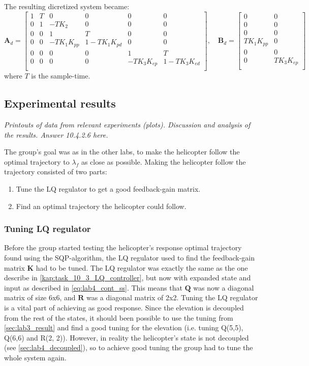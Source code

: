 \documentclass[../main.tex]{subfiles}
\begin{document}
The resulting dicretized system became: 
\begin{equation}\label{eq:lab4_disc_ss}
	\bm A_d = \begin{bmatrix}
		1 & T & 0 & 0 & 0 & 0\\
		0 & 1 & -TK_2 & 0 & 0 & 0\\
		0 & 0 & 1 & T & 0 & 0\\
		0 & 0 & -T K_1 K_{pp} &  1 - T K_1 K_{pd} & 0 & 0\\
		0 & 0 & 0 & 0 & 1 & T \\
		0 & 0 & 0 & 0 & -T K_3 K_{ep} & 1 - TK_3K_{ed} \\
	\end{bmatrix}, \quad
	\bm B_d = \begin{bmatrix}
		0 & 0 \\
		0 & 0\\
		0 & 0\\
		T K_1 K_{pp} & 0\\
		0 & 0 \\
		0 & T K_3K_{ep} \\
	\end{bmatrix}
\end{equation}
where $ T $ is the sample-time.

\subsection{Experimental results}
\textit{Printouts of data from relevant experiments (plots).
Discussion and analysis of the results.
Answer 10.4.2.6 here.}

The group's goal was as in the other labs, to make the helicopter follow the optimal trajectory to $ \lambda_f $ as close as possible. Making the helicopter follow the trajectory consisted of two parts: 
\begin{enumerate}
	\item Tune the LQ regulator to get a good feedback-gain matrix.
	\item Find an optimal trajectory the helicopter could follow.
\end{enumerate}

\subsubsection{Tuning LQ regulator}
Before the group started testing the helicopter's response optimal trajectory found using the SQP-algorithm, the LQ regulator used to find the feedback-gain matrix $\bm K$ had to be tuned. The LQ regulator was exactly the same as the one describe in \cref{kap:task_10_3_LQ_controller}, but now with expanded state and input as described in \cref{eq:lab4_cont_ss}. This means that $ \bm Q $ was now a diagonal matrix of size 6x6, and $ \bm R $ was a diagonal matrix of 2x2. Tuning the LQ regulator is a vital part of achieving as good response. Since the elevation is decoupled from the rest of the states, it should been possible to use the tuning from \cref{sec:lab3_result} and find a good tuning for the elevation (i.e. tuning Q(5,5), Q(6,6) and R(2, 2)). However, in reality the helicopter's state is not decoupled (see \cref{sec:lab4_decoupled}), so to achieve good tuning the group had to tune the whole system again.
\end{document}
